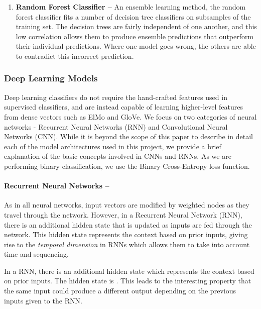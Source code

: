 \documentclass[12pt,a4paper]{article}
\begin{document}
\begin{enumerate}[leftmargin=0cm]
	\item \textbf{Random Forest Classifier --}
	An ensemble learning method, the random forest classifier fits a number of decision tree classifiers on subsamples of the training set. The decision trees are fairly independent of one another, and this low correlation allows them to produce ensemble predictions that outperform their individual predictions. Where one model goes wrong, the others are able to contradict this incorrect prediction.
\end{enumerate}


\subsubsection{Deep Learning Models}
Deep learning classifiers do not require the  hand-crafted features used in supervised classifiers, and are instead capable of learning higher-level features from dense vectors such as ElMo and GloVe. We focus on two categories of neural networks - Recurrent Neural Networks (RNN) and Convolutional Neural Networks (CNN). While it is beyond the scope of this paper to describe in detail each of the model architectures used in this project, we provide a brief explanation of the basic concepts involved in CNNs and RNNs. As we are performing binary classification, we use the Binary Cross-Entropy loss function.



\paragraph{Recurrent Neural Networks --}
As in all neural networks, input vectors are modified by weighted nodes as they travel through the network. However, in a Recurrent Neural Network (RNN), there is an additional hidden state that is updated as inputs are fed through the network. This hidden state represents the context based on prior inputs, giving rise to the \textit{temporal dimension} in RNNs which allows them to take into account time and sequencing.





 In a RNN, there is an additional hidden state which represents the context based on prior inputs. The hidden state is . This leads to the interesting property that the same input could produce a different output depending on the previous inputs given to the RNN.
\end{document}
